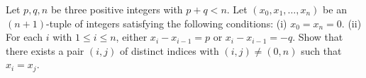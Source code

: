Let $p, q, n$ be three positive integers with $p + q < n$. Let $(x_0, x_1, \ldots, x_n)$ be an $(n+1)$-tuple of integers satisfying the following conditions:
(i) $x_0 = x_n = 0$.
(ii) For each $i$ with $1 \leq i \leq n$, either $x_i - x_{i-1} = p$ or $x_i - x_{i-1} = -q$.
Show that there exists a pair $(i, j)$ of distinct indices with $(i, j) \neq (0, n)$ such that $x_i = x_j$.
